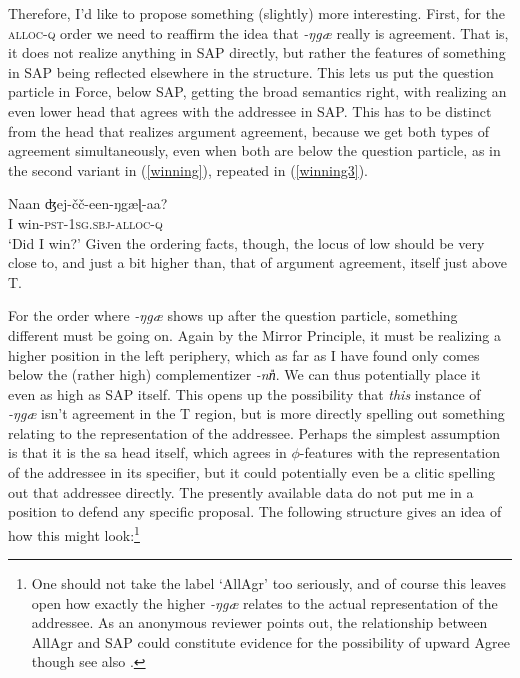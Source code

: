 \documentclass[output=paper, modfonts, nonflat]{langsci/langscibook}
\begin{document}
Therefore, I'd like to propose something (slightly) more
interesting. First, for the \textsc{alloc}{}-\textsc{q} order we need to
reaffirm the idea that \textit{-ŋgæ} really is agreement. That is, it
does not realize anything in SAP directly, but rather the features of
something in SAP being reflected elsewhere in the structure. This lets
us put the question particle in Force, below SAP, getting the broad
semantics right, with \allagr{} realizing an even lower head that
agrees with the addressee in SAP. This has to be distinct from the
head that realizes argument agreement, because we get both types of
agreement simultaneously, even when both are below the question
particle, as in the second variant in (\ref{winning}), repeated in
(\ref{winning3}).

\ea\label{winning3}\gll Naan ʤej-\v{c}\v{c}-een-ŋgæɭ-aa?\\
 I win-\textsc{pst}-1\textsc{sg}.\textsc{sbj}-\textsc{alloc}-\textsc{q}\\
 \glt `Did I win?'
\z
%
Given the ordering facts, though, the locus of low \allagr{} should be
very close to, and just a bit higher than, that of argument agreement,
itself just above T.

\noindent For the order where \textit{-ŋgæ} shows up after the question
particle, something different must be going on. Again by the Mirror
Principle, it must be realizing a higher position in the left
periphery, which as far as I have found only comes below the (rather
high) complementizer \textit{-nn\U}. We can thus potentially place it
even as high as SAP itself. This opens up the possibility that
\emph{this} instance of \textit{-ŋgæ} isn't agreement in the T
region, but is more directly spelling out something relating to the
representation of the addressee. Perhaps the simplest assumption is
that it is the sa head itself, which agrees in $\phi$-features with
the representation of the addressee in its specifier, but it could
potentially even be a clitic spelling out that addressee directly. The
presently available data do not put me in a position to defend any
specific proposal. The following structure gives an idea of how this
might look:\footnote{One should not take the label `AllAgr' too
  seriously, and of course this leaves open how exactly the higher
  \textit{-ŋgæ} relates to the actual representation of the
  addressee. As an anonymous reviewer points out, the relationship
  between AllAgr and SAP could constitute evidence for the possibility
  of upward Agree \citep[e.g.][]{zeijlstra:2012} though see also .}
\end{document}
